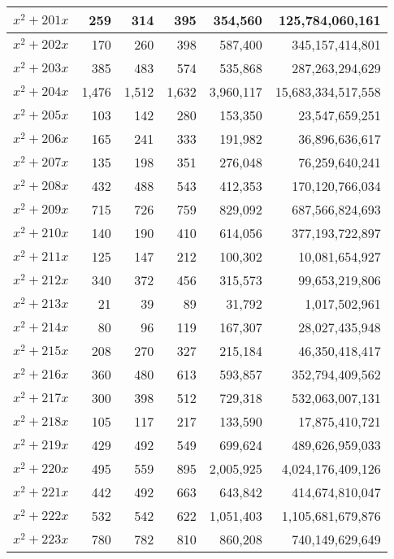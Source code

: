 \documentclass[a4paper]{amsproc}
\theoremstyle{plain}
\theoremstyle{named}
\begin{document}
\begin{longtable}{ | l | r | r | r | r | r | }
$x^2 + 201x$ & 259 & 314 & 395 & 354{,}560 & 125{,}784{,}060{,}161 \\ \hline
$x^2 + 202x$ & 170 & 260 & 398 & 587{,}400 & 345{,}157{,}414{,}801 \\ \hline
$x^2 + 203x$ & 385 & 483 & 574 & 535{,}868 & 287{,}263{,}294{,}629 \\ \hline
$x^2 + 204x$ & 1{,}476 & 1{,}512 & 1{,}632 & 3{,}960{,}117 & 15{,}683{,}334{,}517{,}558 \\ \hline
$x^2 + 205x$ & 103 & 142 & 280 & 153{,}350 & 23{,}547{,}659{,}251 \\ \hline
$x^2 + 206x$ & 165 & 241 & 333 & 191{,}982 & 36{,}896{,}636{,}617 \\ \hline
$x^2 + 207x$ & 135 & 198 & 351 & 276{,}048 & 76{,}259{,}640{,}241 \\ \hline
$x^2 + 208x$ & 432 & 488 & 543 & 412{,}353 & 170{,}120{,}766{,}034 \\ \hline
$x^2 + 209x$ & 715 & 726 & 759 & 829{,}092 & 687{,}566{,}824{,}693 \\ \hline
$x^2 + 210x$ & 140 & 190 & 410 & 614{,}056 & 377{,}193{,}722{,}897 \\ \hline
$x^2 + 211x$ & 125 & 147 & 212 & 100{,}302 & 10{,}081{,}654{,}927 \\ \hline
$x^2 + 212x$ & 340 & 372 & 456 & 315{,}573 & 99{,}653{,}219{,}806 \\ \hline
$x^2 + 213x$ & 21 & 39 & 89 & 31{,}792 & 1{,}017{,}502{,}961 \\ \hline
$x^2 + 214x$ & 80 & 96 & 119 & 167{,}307 & 28{,}027{,}435{,}948 \\ \hline
$x^2 + 215x$ & 208 & 270 & 327 & 215{,}184 & 46{,}350{,}418{,}417 \\ \hline
$x^2 + 216x$ & 360 & 480 & 613 & 593{,}857 & 352{,}794{,}409{,}562 \\ \hline
$x^2 + 217x$ & 300 & 398 & 512 & 729{,}318 & 532{,}063{,}007{,}131 \\ \hline
$x^2 + 218x$ & 105 & 117 & 217 & 133{,}590 & 17{,}875{,}410{,}721 \\ \hline
$x^2 + 219x$ & 429 & 492 & 549 & 699{,}624 & 489{,}626{,}959{,}033 \\ \hline
$x^2 + 220x$ & 495 & 559 & 895 & 2{,}005{,}925 & 4{,}024{,}176{,}409{,}126 \\ \hline
$x^2 + 221x$ & 442 & 492 & 663 & 643{,}842 & 414{,}674{,}810{,}047 \\ \hline
$x^2 + 222x$ & 532 & 542 & 622 & 1{,}051{,}403 & 1{,}105{,}681{,}679{,}876 \\ \hline
$x^2 + 223x$ & 780 & 782 & 810 & 860{,}208 & 740{,}149{,}629{,}649 \\ \hline

\end{longtable}
\end{document}
